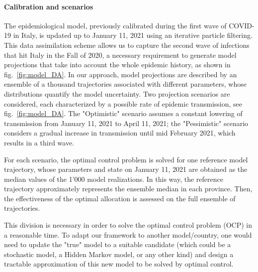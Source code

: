 \paragraph{Calibration and scenarios}The epidemiological model, previously calibrated during the first wave of COVID-19 in Italy\cite{Gatto:SpreadDynamicsCOVID19:2020,Bertuzzo:GeographyCOVID19Spread:2020}, is updated up to January 11, 2021 using an iterative particle filtering. This data assimilation scheme allows us to capture the second wave of infections that hit Italy in the Fall of 2020, a necessary requirement to generate model projections that take into account the whole epidemic history, as shown in fig.~\ref{fig:model_DA}. In our approach, model projections are described by an ensemble of a thousand trajectories associated with different parameters, whose distributions quantify the model uncertainty. 
Two projection scenarios are considered, each characterized by a possible rate of epidemic transmission, see fig.~\ref{fig:model_DA}. The "Optimistic" scenario assumes a constant lowering of transmission from January 11, 2021 to April 11, 2021; the "Pessimistic" scenario considers a gradual increase in transmission until mid February 2021, which results in a third wave. 

For each scenario, the optimal control problem is solved for one reference model trajectory, whose parameters and state on January 11, 2021 are obtained as the median values of the 1'000 model realizations. In this way, the reference trajectory approximately represents the ensemble median in each province. Then, the effectiveness of the optimal allocation is assessed on the full ensemble of trajectories.



This division is necessary in order to solve the optimal control problem (OCP) in a reasonable time. To adapt our framework to another model/country, one would need to update the "true" model to a suitable candidate (which could be a stochastic model, a Hidden Markov model, or any other kind) and design a tractable approximation of this new model to be solved by optimal control.

